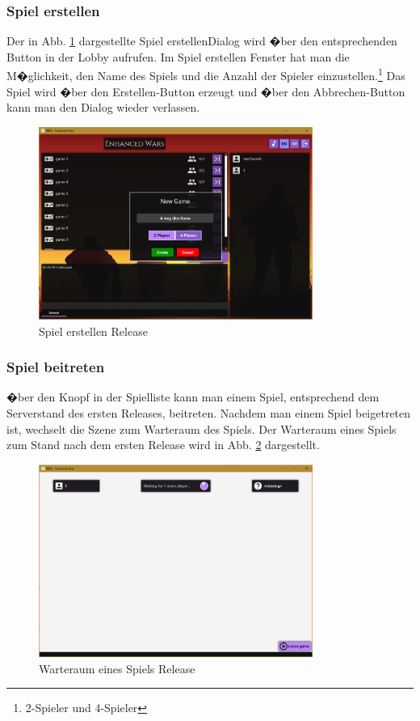 \documentclass[12pt, titlepage]{scrartcl}
\newcommand{\RN}[1]{%
	\textup{\uppercase\expandafter{\romannumeral#1}}%
}
\begin{document}
		\subsubsection{Spiel erstellen}
		Der in Abb. \ref{CreateGame_Release_One} dargestellte \glqq Spiel erstellen\grqq Dialog wird �ber den entsprechenden Button in der Lobby aufrufen. Im Spiel erstellen Fenster hat man die M�glichkeit, den Name des Spiels und die Anzahl der Spieler einzustellen.\footnote{2-Spieler und 4-Spieler} Das Spiel wird �ber den \glqq Erstellen\grqq-Button erzeugt und �ber den \glqq Abbrechen\grqq-Button kann man den Dialog wieder verlassen.
		\begin{figure}[H] 
			\centering
			\includegraphics[width=0.8\textwidth]{CreateGame_Release_One.PNG}
			\caption{Spiel erstellen Release \RN{1}}
			\label{CreateGame_Release_One}
		\end{figure}
		\subsubsection{Spiel beitreten}
		�ber den Knopf in der Spielliste kann man einem Spiel, entsprechend dem Serverstand des ersten Releases, beitreten. Nachdem man einem Spiel beigetreten ist, wechselt die Szene zum Warteraum des Spiels. Der Warteraum eines Spiels zum Stand nach dem ersten Release wird in Abb. \ref{WaitingRoom_Release_One} dargestellt.
		 \begin{figure}[H] 
		 	\centering
		 	\includegraphics[width=0.8\textwidth]{WaitingRoom_Release_One.PNG}
		 	\caption{Warteraum eines Spiels Release \RN{1}}
		 	\label{WaitingRoom_Release_One}
		 \end{figure}
\end{document}
